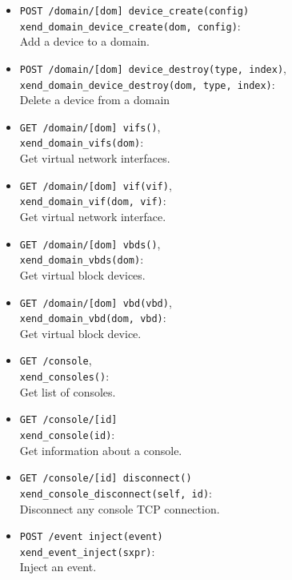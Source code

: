 \documentclass[11pt,twoside,final,openright]{report}
\begin{document}
\begin{itemize}
\item {\tt POST /domain/[dom] device\_create(config)}\\
  {\tt xend\_domain\_device\_create(dom, config)}:\\
  Add a device to a domain.

\item {\tt POST /domain/[dom] device\_destroy(type, index)},\\
  {\tt xend\_domain\_device\_destroy(dom, type, index)}:\\
  Delete a device from a domain

\item {\tt GET /domain/[dom] vifs()},\\
  {\tt xend\_domain\_vifs(dom)}:\\
  Get virtual network interfaces.

\item {\tt GET /domain/[dom] vif(vif)},\\
  {\tt xend\_domain\_vif(dom, vif)}:\\
  Get virtual network interface.

\item {\tt GET /domain/[dom] vbds()},\\
  {\tt xend\_domain\_vbds(dom)}:\\
  Get virtual block devices.

\item {\tt GET /domain/[dom] vbd(vbd)},\\
  {\tt xend\_domain\_vbd(dom, vbd)}:\\
  Get virtual block device.

\item {\tt GET /console},\\
  {\tt xend\_consoles()}:\\
  Get list of consoles.

\item {\tt GET /console/[id]}\\
  {\tt xend\_console(id)}:\\
  Get information about a console.

\item {\tt GET /console/[id] disconnect()}\\
  {\tt xend\_console\_disconnect(self, id)}:\\
  Disconnect any console TCP connection.

\item {\tt POST /event inject(event)}\\
  {\tt xend\_event\_inject(sxpr)}:\\
  Inject an event.

\end{itemize}
\end{document}
